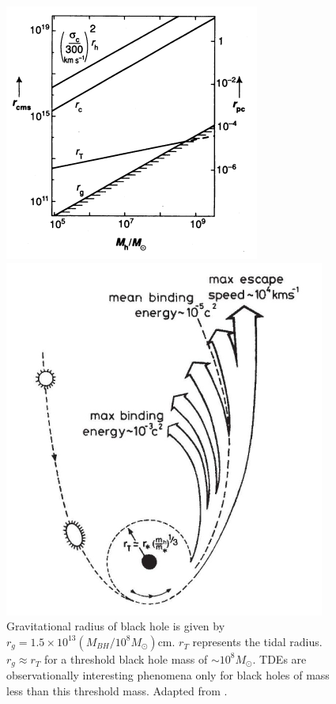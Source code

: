 \documentclass{tda}
\begin{document}
\begin{figure} [h]
	\centering
	\begin{minipage} {.45\textwidth}
		\centering
		\captionsetup{width=0.85\linewidth}
		\includegraphics[width=0.9\linewidth]{./images/rees1990.png}
		\caption{Gravitational radius of black hole is given by \(r^{}_g = 1.5 \times 10^{13} (M_{BH}/10^8 M_\odot)\)cm. \(r^{}_T\) represents the tidal radius. \(r^{}_g \approx r^{}_T\) for a threshold black hole mass of \(\sim 10^8 M_\odot\). TDEs are observationally interesting phenomena only for black holes of mass less than this threshold mass. Adapted from \cite{rees_dead_1990}.}
	\end{minipage}%
	\begin{minipage} {.45\textwidth}
		\centering
		\captionsetup{width=0.85\linewidth}
		\includegraphics[width=0.9\linewidth]{./images/rees1988.png}

\end{minipage}
\end{figure}
\end{document}
